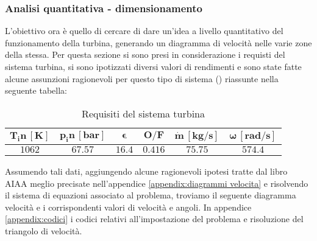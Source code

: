 \subsubsection{Analisi quantitativa - dimensionamento}

L'obiettivo ora è quello di cercare di dare un'idea a livello quantitativo del funzionamento della turbina, generando un diagramma di velocità nelle varie zone della stessa. 
Per questa sezione si sono presi in considerazione i requisti del sistema turbina, si sono ipotizzati diversi valori di rendimenti e sono state fatte alcune assunzioni ragionevoli per questo tipo di sistema (\cite{AIAA_book_2}) riassunte nella seguente tabella: 
\begin{table}[H]

\centering
\begin{tabular}{|c|c|c|c|c|c|}
\hline
$\bm{T_in \, [K]}$ & $\bm{p_in \, [bar]}$ & $\bm{\epsilon}$ &  $\bm{O/F}$ & $\bm{\dot{m} \, [kg/s]}$ & $\bm{\omega \, [rad/s]}$  \\
\hline
$1062$ & $67.57$ & $16.4$ &  $0.416$ & $75.75$ & $574.4$ \\
\hline
\end{tabular}

\caption{Requisiti del sistema turbina}
\label{table:turbine specs}

\end{table}

Assumendo tali dati, aggiungendo alcune ragionevoli ipotesi tratte dal libro AIAA meglio precisate nell'appendice \autoref{appendix:diagrammi velocita} e risolvendo il sistema di equazioni associato al problema, troviamo il seguente diagramma velocità e i corrispondenti valori di velocità e angoli. In appendice \autoref{appendix:codici} i codici relativi all'impostazione del problema e risoluzione del triangolo di velocità.

